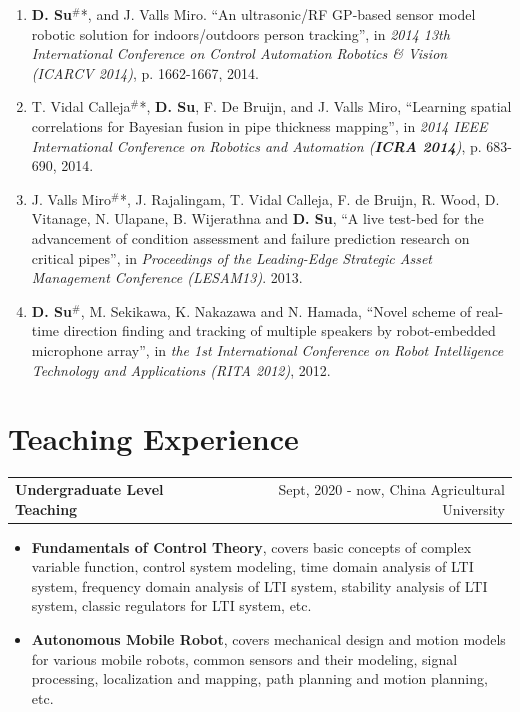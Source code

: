 \documentclass[margin,line]{res}
\begin{document}
\begin{resume}
\begin{enumerate}
\item {\bf D. Su}$^{\#}$*, and J. Valls Miro. ``An ultrasonic/RF GP-based sensor model robotic solution for indoors/outdoors person tracking'', in {\it 2014 13th International Conference on Control Automation Robotics \& Vision (ICARCV 2014)}, p. 1662-1667, 2014.

\item T. Vidal Calleja$^{\#}$*, {\bf D. Su}, F. De Bruijn, and J. Valls Miro, ``Learning spatial correlations for Bayesian fusion in pipe thickness mapping'', in {\it 2014 IEEE International Conference on Robotics and Automation (\textbf{ICRA 2014})}, p. 683-690, 2014.

\item J. Valls Miro$^{\#}$*, J. Rajalingam, T. Vidal Calleja, F. de Bruijn, R. Wood, D. Vitanage, N. Ulapane, B. Wijerathna and {\bf D. Su}, ``A live test-bed for the advancement of condition assessment and failure prediction research on critical pipes'', in {\it Proceedings of the Leading-Edge Strategic Asset Management Conference (LESAM13)}. 2013.

\item {\bf D. Su}$^{\#}$, M. Sekikawa, K. Nakazawa and N. Hamada, ``Novel scheme of real-time direction finding and tracking of multiple speakers by robot-embedded microphone array'', in {\it the 1st International Conference on Robot Intelligence Technology and Applications (RITA 2012)}, 2012.

\end{enumerate}

\section{\sc Teaching Experience}

\begin{tabularx}{\textwidth}{X r}
{\bf Undergraduate Level Teaching} & Sept, 2020 - now, China Agricultural University\\
\end{tabularx}
\begin{itemize}
\item[] \textbf{Fundamentals of Control Theory}, covers basic concepts of complex variable function, control system modeling, time domain analysis of LTI system, frequency domain analysis of LTI system, stability analysis of LTI system, classic regulators for LTI system, etc.

\item[] \textbf{Autonomous Mobile Robot}, covers mechanical design and motion models for various mobile robots, common sensors and their modeling, signal processing, localization and mapping, path planning and motion planning, etc.


\end{itemize}
\end{resume}
\end{document}
